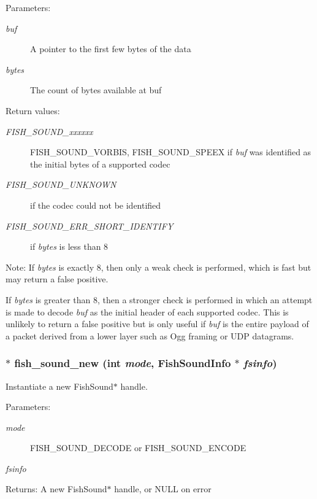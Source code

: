 \begin{Desc}
\item[Parameters:]
\begin{description}
\item[{\em buf}]A pointer to the first few bytes of the data \item[{\em bytes}]The count of bytes available at buf \end{description}
\end{Desc}
\begin{Desc}
\item[Return values:]
\begin{description}
\item[{\em FISH\_\-SOUND\_\-xxxxxx}]FISH\_\-SOUND\_\-VORBIS, FISH\_\-SOUND\_\-SPEEX if {\em buf\/} was identified as the initial bytes of a supported codec \item[{\em FISH\_\-SOUND\_\-UNKNOWN}]if the codec could not be identified \item[{\em FISH\_\-SOUND\_\-ERR\_\-SHORT\_\-IDENTIFY}]if {\em bytes\/} is less than 8 \end{description}
\end{Desc}
\begin{Desc}
\item[Note:]If {\em bytes\/} is exactly 8, then only a weak check is performed, which is fast but may return a false positive. 

If {\em bytes\/} is greater than 8, then a stronger check is performed in which an attempt is made to decode {\em buf\/} as the initial header of each supported codec. This is unlikely to return a false positive but is only useful if {\em buf\/} is the entire payload of a packet derived from a lower layer such as Ogg framing or UDP datagrams. \end{Desc}
\subsubsection{$\ast$ fish\_\-sound\_\-new (int {\em mode}, {\bf Fish\-Sound\-Info} $\ast$ {\em fsinfo})}\label{fishsound_8h_a4}


Instantiate a new Fish\-Sound$\ast$ handle. 

\begin{Desc}
\item[Parameters:]
\begin{description}
\item[{\em mode}]FISH\_\-SOUND\_\-DECODE or FISH\_\-SOUND\_\-ENCODE \item[{\em fsinfo}]\end{description}
\end{Desc}
\begin{Desc}
\item[Returns:]A new Fish\-Sound$\ast$ handle, or NULL on error \end{Desc}

